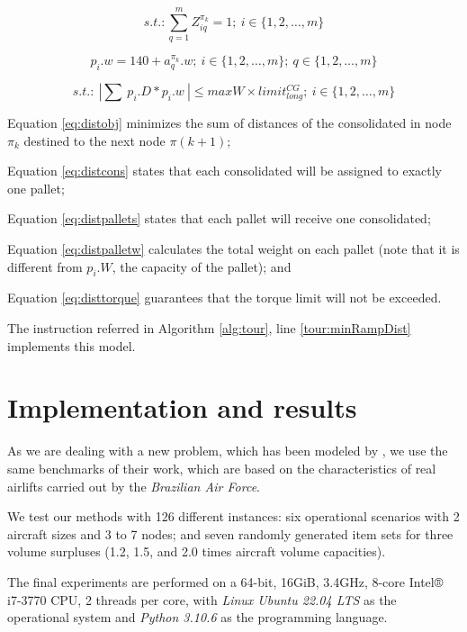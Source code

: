 \documentclass[preprint,authoryear]{elsarticle}
\begin{document}
\begin{equation} \label{eq:distpallets}
	s.t.: \sum_{q=1}^{m} Z^{\pi_k}_{iq}=1;\ i \in \{1,2,\ldots,m\}
\end{equation}

\begin{equation} \label{eq:distpalletw}
	p_i.w = 140 + a^{\pi_k}_q.w ;\ i \in \{1,2,\ldots,m\};\ q \in \{1,2,\ldots,m\}
\end{equation}

\begin{equation} \label{eq:disttorque}
	s.t.:\ | \sum\ p_i.D * p_i.w\ | \leq maxW \times limit^{CG}_{long} ;\ i \in \{1,2,\ldots,m\}
\end{equation}

Equation \ref{eq:distobj} minimizes the sum of distances of the consolidated in node $\pi_k$ destined to the next node $\pi(k+1)$;

Equation \ref{eq:distcons} states that each consolidated will be assigned to exactly one pallet;

Equation \ref{eq:distpallets} states that each pallet will receive one consolidated;

Equation \ref{eq:distpalletw} calculates the total weight on each pallet (note that it is different from $p_i.W$, the capacity of the pallet); and

Equation \ref{eq:disttorque} guarantees that the torque limit will not be exceeded. 

The instruction referred in Algorithm \ref{alg:tour}, line \ref{tour:minRampDist} implements this model.

\section{Implementation and results}
\label{sec6}


As we are dealing with a new problem, which has been modeled by \cite{MesquitaSanches2023}, we use the same benchmarks of their work, which are based on the characteristics of real airlifts carried out by the {\em Brazilian Air Force}.
 
We test our methods with 126 different instances: six operational scenarios with 2 aircraft sizes and 3 to 7 nodes; and seven randomly generated item sets for three volume surpluses (1.2, 1.5, and 2.0 times aircraft volume capacities).

The final experiments are performed on a 64-bit, 16GiB, 3.4GHz, 8-core Intel® i7-3770 CPU, 2 threads per core, with {\it Linux Ubuntu 22.04 LTS} as the operational system and {\it Python 3.10.6} as the programming language.
\end{document}
